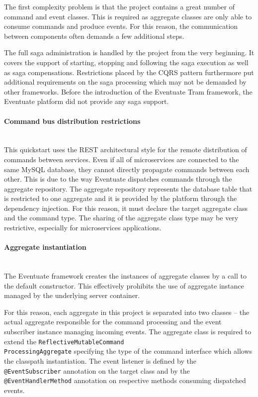 \documentclass[oneside,
  digital, %
  table,   %
  lof,     %
  lot,     %
]{fithesis3}
\newcommand{\newlinepar}[1]{\paragraph{#1}\needspace{4\baselineskip}\mbox{}\\}
\begin{document}
The first complexity problem is that the project contains a great number of command and event classes. This is required as aggregate classes are only able to consume commands and produce events. For this reason,  the communication between components often demands a few additional steps.

The full saga administration is handled by the project from the very beginning. It covers the support of starting, stopping and following the saga execution as well as saga compensations. Restrictions placed by the CQRS pattern furthermore put additional requirements on the saga processing which may not be demanded by other frameworks. Before the introduction of the Eventuate Tram framework, the Eventuate platform did not provide any saga support.

\newlinepar{Command bus distribution restrictions}

This quickstart uses the REST architectural style for the remote distribution of commands between services. Even if all of microservices are connected to the same MySQL database, they cannot directly propagate commands between each other. This is due to the way Eventuate dispatches commands through the aggregate repository. The aggregate repository represents the database table that is restricted to one aggregate and it is provided by the platform through the dependency injection. For this reason, it must declare the target aggregate class and the command type. The sharing of the aggregate class type may be very restrictive, especially for microservices applications.

\newlinepar{Aggregate instantiation}

The Eventuate framework creates the instances of aggregate classes by a call to the default constructor. This effectively prohibits the use of aggregate instance managed by the underlying server container. 

For this reason, each aggregate in this project is separated into two classes -- the actual aggregate responsible for the command processing and the event subscriber instance managing incoming events. The  aggregate class is required to extend the \texttt{ReflectiveMutableCommand\\ProcessingAggregate} specifying the type of the command interface which allows the classpath instantiation. The event listener is defined by the \texttt{@EventSubscriber} annotation on the target class and by the \texttt{@EventHandlerMethod} annotation on respective methods consuming dispatched events. 
\end{document}
